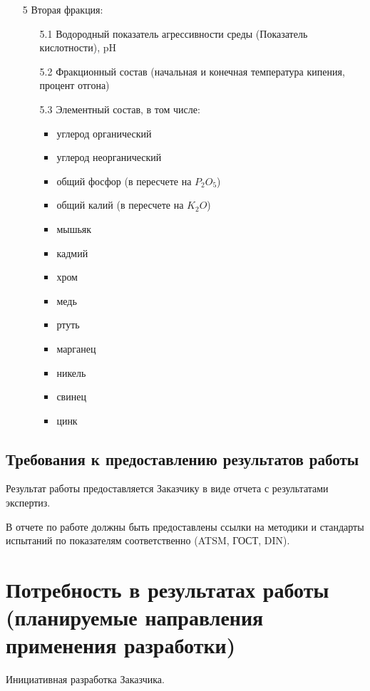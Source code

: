 \documentclass[russian,utf8]{eskdtext}
\begin{document}
\begin{enumerate}
   \item[5] Вторая фракция:
      \begin{enumerate}
      \item[5.1] Водородный показатель агрессивности среды (Показатель кислотности), pH
      \item[5.2] Фракционный состав (начальная и конечная температура кипения, процент отгона)
      \item[5.3] Элементный состав, в том числе:
         \begin{itemize}
         \item углерод органический
         \item углерод неорганический
         \item общий фосфор (в пересчете на  $P_{2}O_{5}$)
         \item общий калий (в пересчете на  $K_{2}O$)
         \item мышьяк  
         \item кадмий
         \item хром 
         \item медь 
         \item ртуть
         \item марганец 
         \item никель 
         \item свинец 
         \item цинк 
         \end{itemize}
      \end{enumerate}
   \end{enumerate}
   \subsection{Требования к предоставлению результатов работы}
   Результат работы предоставляется Заказчику в виде отчета с результатами экспертиз.
      
   В отчете по работе должны быть предоставлены ссылки на методики и стандарты испытаний по показателям соответственно (ATSM, ГОСТ, DIN). 
   
   
   \section{Потребность в результатах работы (планируемые направления применения разработки)}
   Инициативная разработка Заказчика.
\end{document}
